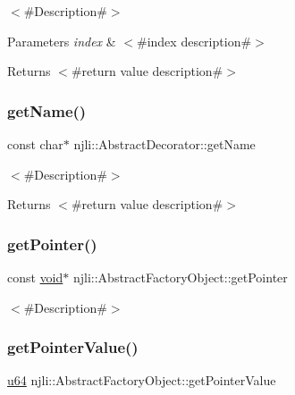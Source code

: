 $<$\#\+Description\#$>$


\begin{DoxyParams}{Parameters}
{\em index} & $<$\#index description\#$>$\\
\hline
\end{DoxyParams}
\begin{DoxyReturn}{Returns}
$<$\#return value description\#$>$ 
\end{DoxyReturn}
\mbox{\label{classnjli_1_1_sprite_frame_atlas_ad41266885be835f3ee602311e20877a4}} 
\subsubsection{\texorpdfstring{get\+Name()}{getName()}}
{\footnotesize\ttfamily const char$\ast$ njli\+::\+Abstract\+Decorator\+::get\+Name}

$<$\#\+Description\#$>$

\begin{DoxyReturn}{Returns}
$<$\#return value description\#$>$ 
\end{DoxyReturn}
\mbox{\label{classnjli_1_1_sprite_frame_atlas_ac4ca71716ed832be357f15f8262c8448}} 
\subsubsection{\texorpdfstring{get\+Pointer()}{getPointer()}}
{\footnotesize\ttfamily const \mbox{\hyperlink{_thread_8h_af1e856da2e658414cb2456cb6f7ebc66}{void}}$\ast$ njli\+::\+Abstract\+Factory\+Object\+::get\+Pointer}

$<$\#\+Description\#$>$ \mbox{\label{classnjli_1_1_sprite_frame_atlas_a4ffddf141a426a5a07d0ac19f1913811}} 
\subsubsection{\texorpdfstring{get\+Pointer\+Value()}{getPointerValue()}}
{\footnotesize\ttfamily \mbox{\hyperlink{_util_8h_ad758b7a5c3f18ed79d2fcd23d9f16357}{u64}} njli\+::\+Abstract\+Factory\+Object\+::get\+Pointer\+Value}

